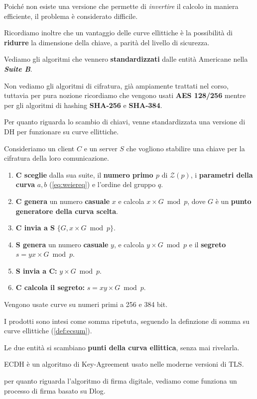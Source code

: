 Poiché non esiste una versione che permette di \textit{invertire} il calcolo in maniera efficiente, il problema è considerato difficile.\\
\begin{remark}
Ricordiamo inoltre che un vantaggio delle curve ellittiche è la possibilità di \textbf{ridurre} la dimensione della chiave, a parità del livello di sicurezza.
\end{remark}
Vediamo gli algoritmi che vennero \textbf{standardizzati} dalle entità Americane nella \textbf{\textit{Suite B}}.\\
\begin{remark}
Non vediamo gli algoritmi di cifratura, già ampiamente trattati nel corso, tuttavia per pura nozione ricordiamo che vengono usati \textbf{AES 128/256} mentre per gli algoritmi di hashing \textbf{SHA-256} e \textbf{SHA-384}.
\end{remark}
Per quanto riguarda lo scambio di chiavi, venne standardizzata una versione di DH per funzionare su curve ellittiche.
\begin{definition}\label{def:ecdh}
Consideriamo un client $C$ e un server $S$ che vogliono stabilire una chiave per la cifratura della loro comunicazione.
\begin{enumerate}
    \item \textbf{C sceglie} dalla sua suite, il \textbf{numero primo $p$} di $\mathcal{Z}(p)$, i \textbf{parametri della curva} $a,b$ (\cref{eq:weiereq}) e l'ordine del gruppo $q$.
    \item \textbf{C genera} un numero \textbf{casuale} $x$ e calcola $x\times G\bmod p$, dove $G$ è un \textbf{punto generatore della curva scelta}.
    \item \textbf{C invia a S} $\{G,x\times G\bmod p\}$.
    \item \textbf{S genera} un numero \textbf{casuale} $y$, e calcola $y\times G\bmod p$ e il \textbf{segreto} $s=yx\times G\bmod p$.
    \item \textbf{S invia a C:} $y\times G\bmod p$.
    \item \textbf{C calcola il segreto:} $s=xy\times G\bmod p$.
\end{enumerate}
Vengono usate curve su numeri primi a 256 e 384 bit.
\begin{remark}
I prodotti sono intesi come somma ripetuta, seguendo la definzione di somma su curve ellittiche (\cref{def:ecsum}).
\end{remark}
\begin{remark}
Le due entità si scambiano \textbf{punti della curva ellittica}, senza mai rivelarla.
\end{remark}
\end{definition}
\begin{remark}
ECDH è un algoritmo di Key-Agreement usato nelle moderne versioni di TLS.
\end{remark}
per quanto riguarda l'algoritmo di firma digitale, vediamo come funziona un processo di firma basato su Dlog.


